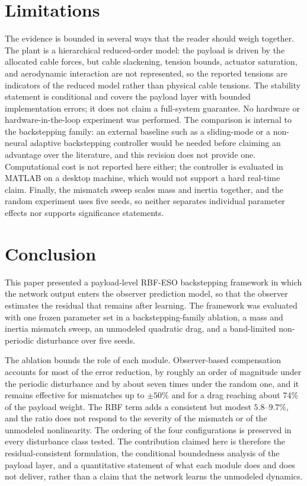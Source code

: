 \documentclass[Review,sageh,times]{sagej}
\begin{document}
\section*{Limitations}

The evidence is bounded in several ways that the reader should weigh together.
The plant is a hierarchical reduced-order model: the payload is driven by the
allocated cable forces, but cable slackening, tension bounds, actuator
saturation, and aerodynamic interaction are not represented, so the reported
tensions are indicators of the reduced model rather than physical cable
tensions. The stability statement is conditional and covers the payload layer
with bounded implementation errors; it does not claim a full-system guarantee.
No hardware or hardware-in-the-loop experiment was performed. The comparison
is internal to the backstepping family: an external baseline such as a
sliding-mode or a non-neural adaptive backstepping controller would be needed
before claiming an advantage over the literature, and this revision does not
provide one. Computational cost is not reported here either; the controller is
evaluated in MATLAB on a desktop machine, which would not support a hard
real-time claim. Finally, the mismatch sweep scales mass and inertia together,
and the random experiment uses five seeds, so neither separates individual
parameter effects nor supports significance statements.

\section*{Conclusion}

This paper presented a payload-level RBF-ESO backstepping framework in which
the network output enters the observer prediction model, so that the observer
estimates the residual that remains after learning. The framework was evaluated
with one frozen parameter set in a backstepping-family ablation, a mass and
inertia mismatch sweep, an unmodeled quadratic drag, and a band-limited
non-periodic disturbance over five seeds.

The ablation bounds the role of each module. Observer-based compensation
accounts for most of the error reduction, by roughly an order of magnitude
under the periodic disturbance and by about seven times under the random one,
and it remains effective for mismatches up to $\pm50\%$ and for a drag reaching
about $74\%$ of the payload weight. The RBF term adds a consistent but modest
$5.8$--$9.7\%$, and the ratio does not respond to the severity of the mismatch
or of the unmodeled nonlinearity. The ordering of the four configurations is
preserved in every disturbance class tested. The contribution claimed here is
therefore the residual-consistent formulation, the conditional boundedness
analysis of the payload layer, and a quantitative statement of what each
module does and does not deliver, rather than a claim that the network learns
the unmodeled dynamics.
\end{document}
